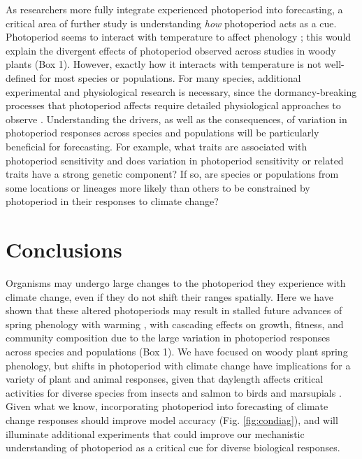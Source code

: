 \documentclass{article}
\begin{document}
\par As researchers more fully integrate experienced photoperiod into forecasting, a critical area of further study is understanding \emph{how} photoperiod acts as a cue. Photoperiod seems to interact with temperature to affect phenology \citep[e.g., Box 1,][]{zydlewski2014}; this would explain the divergent effects of photoperiod observed across studies in woody plants (Box 1). However, exactly how it interacts with temperature is not well-defined for most species or populations. For many species, additional experimental and physiological research is necessary, since the dormancy-breaking processes that photoperiod affects require detailed physiological approaches to observe \citep[Box 2,][]{hanninen2019, chuine2016}. Understanding the drivers, as well as the consequences, of variation in photoperiod responses across species and populations will be particularly beneficial for forecasting. For example, what traits are associated with photoperiod sensitivity and does variation in photoperiod sensitivity or related traits have a strong genetic component? If so, are species or populations from some locations or lineages more likely than others to be constrained by photoperiod in their responses to climate change?

\section*{Conclusions}
Organisms may undergo large changes to the photoperiod they experience with climate change, even if they do not shift their ranges spatially. Here we have shown that these altered photoperiods may result in stalled future advances of spring phenology with warming \cite[e.g., Table S1, Fig. S1,][]{fu2019, gusewell2017,yu2010}, with cascading effects on growth, fitness, and community composition due to the large variation in photoperiod responses across species and populations (Box 1). We have focused on woody plant spring phenology, but shifts in photoperiod with climate change have implications for a variety of plant and animal responses, given that daylength affects critical activities for diverse species from insects \citep{bradshaw2006} and salmon \citep{taranger2003} to birds \citep{dawson2001} and marsupials \citep{mcallan2006}. Given what we know, incorporating photoperiod into forecasting of climate change responses should improve model accuracy (Fig. \ref{fig:condiag}), and will illuminate additional experiments that could improve our mechanistic understanding of photoperiod as a critical cue for diverse biological responses. 
\end{document}

